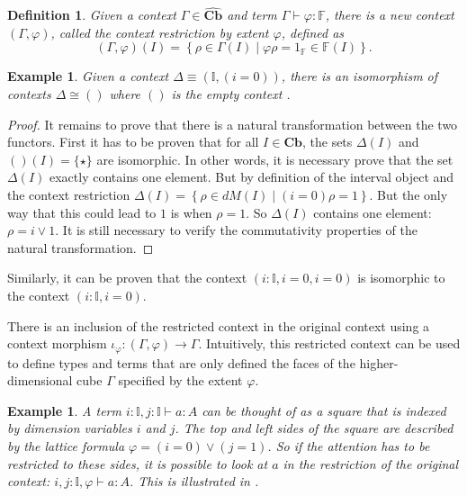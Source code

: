 \documentclass[12pt,a4paper,twoside,xetex]{book} %
\newcommand{\keyword}[1]{\emph{#1}\index{#1}}
\newtheorem{definition}[theorem]{Definition}
\newtheorem{example}[theorem]{Example}
\newcommand{\psh}[1]{\widehat{#1}}
\newcommand{\cube}[0]{\textbf{Cb}}
\begin{document}
\begin{definition}\label{contextrestriction}
Given a context $\Gamma \in \psh{\cube}$ and term $\Gamma \vdash \varphi : \mathbb{F}$, there is a new context $(\Gamma , \varphi)$, called the 
\keyword{context restriction by extent $\varphi$}, defined as  $$(\Gamma 
, \varphi)(I) = \left\{ \rho \in \Gamma (I) \mid \varphi \rho = 1_{\mathbb{F}} 
\in \mathbb{F}(I) \right \} .$$
\end{definition}
 
\begin{example}
Given a context $\Delta \equiv (\mathbb{I}, (i=0))$, there is an isomorphism of contexts
$\Delta \cong ()$ where $()$ is the empty context .
\end{example} 

\begin{proof}
It remains to prove that there is a natural transformation between the 
two functors. First it has to be proven that for all $I \in \cube$, the 
sets $\Delta (I)$ and $()(I)=\{\star \}$ are isomorphic. In other words, it is 
necessary prove that the set $\Delta (I)$ exactly contains one element. But by 
definition of the interval object and the context restriction $\Delta (I) = 
\left\{  \rho \in dM(I) \mid (i=0) \rho = 1 \right\}$. But the only way that 
this could lead to $1$ is when $\rho = 1$. So $\Delta (I)$ contains one element: 
$\rho = i \vee 1$. It is still necessary to verify the commutativity properties 
of the natural transformation.
\end{proof}
 
 Similarly, it can be proven that the context $(i: \mathbb{I}, i=0, i=0)$ is 
isomorphic to the context $(i : \mathbb{I}, i = 0)$. 
 
There is an inclusion of the restricted context in the original context using a 
context morphism $\iota_{\varphi} : (\Gamma , \varphi ) \rightarrow \Gamma $. 
Intuitively, this restricted context can be used to define types and terms that 
are only defined the faces of the higher-dimensional cube $\Gamma$ specified by 
the extent $\varphi$.  

\begin{example}
A term $i : \mathbb{I}, j: \mathbb{I} \vdash a : A$ can be thought of as a 
square that is indexed by dimension variables $i$ and $j$. The top and left 
sides of the square are described by the lattice formula $\varphi = (i=0) \vee 
(j=1)$. So if the attention has to be restricted to these sides, it is possible 
to look at $a$ in the restriction of the original context: $i , j : \mathbb{I}, 
 \varphi \vdash a : A$. This is illustrated in .
\end{example}
\end{document}
